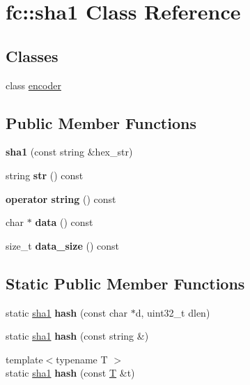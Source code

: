 \hypertarget{classfc_1_1sha1}{}\section{fc\+:\+:sha1 Class Reference}
\label{classfc_1_1sha1}
\subsection*{Classes}
\begin{DoxyCompactItemize}
\item 
class \mbox{\hyperlink{classfc_1_1sha1_1_1encoder}{encoder}}
\end{DoxyCompactItemize}
\subsection*{Public Member Functions}
\begin{DoxyCompactItemize}
\item 
\mbox{\label{classfc_1_1sha1_a08bccd05fe449e9aa74c566c4d58c912}} 
{\bfseries sha1} (const string \&hex\+\_\+str)
\item 
\mbox{\label{classfc_1_1sha1_ad4958485fe7f4888c5305f5608692e81}} 
string {\bfseries str} () const
\item 
\mbox{\label{classfc_1_1sha1_a6aba670bfa95ec8c172e2a20bcbe8fc7}} 
{\bfseries operator string} () const
\item 
\mbox{\label{classfc_1_1sha1_a0f0c56ec4e140dd939ae815ae19d5daa}} 
char $\ast$ {\bfseries data} () const
\item 
\mbox{\label{classfc_1_1sha1_aa8c80cda8f5b1e058032f57a9ccbde2e}} 
size\+\_\+t {\bfseries data\+\_\+size} () const
\end{DoxyCompactItemize}
\subsection*{Static Public Member Functions}
\begin{DoxyCompactItemize}
\item 
\mbox{\label{classfc_1_1sha1_ae2b17c52fe5c1bb6a91325decc3b8f7c}} 
static \mbox{\hyperlink{classfc_1_1sha1}{sha1}} {\bfseries hash} (const char $\ast$d, uint32\+\_\+t dlen)
\item 
\mbox{\label{classfc_1_1sha1_a30eeaae57936fd1c27d6203b7475323c}} 
static \mbox{\hyperlink{classfc_1_1sha1}{sha1}} {\bfseries hash} (const string \&)
\item 
\mbox{\label{classfc_1_1sha1_a8be36f5b5ea215d0a66915c0253cf4ae}} 
{\footnotesize template$<$typename T $>$ }\\static \mbox{\hyperlink{classfc_1_1sha1}{sha1}} {\bfseries hash} (const \mbox{\hyperlink{struct_t}{T}} \&t)
\end{DoxyCompactItemize}
